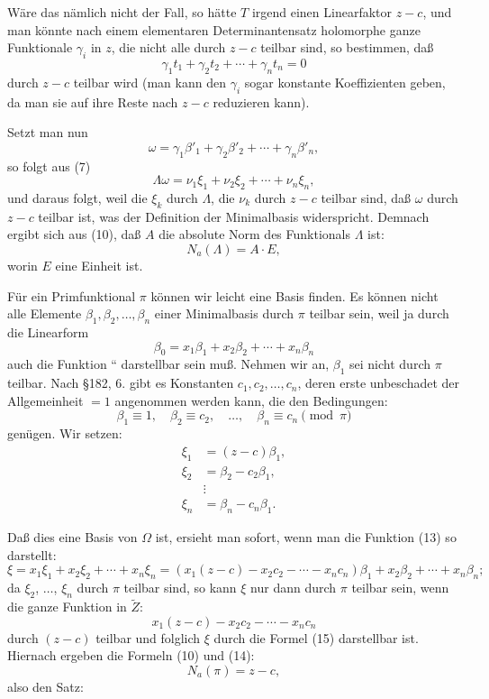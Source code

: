 \documentclass[12pt,a4paper]{article}
\theoremstyle{definition}
\begin{document}
Wäre das nämlich nicht der Fall, so hätte $T$ irgend einen Linearfaktor $z - c$, und man könnte nach einem elementaren Determinantensatz holomorphe ganze Funktionale $\gamma_i$ in $z$, die nicht alle durch $z - c$ teilbar sind, so bestimmen, daß
\[\gamma_1t_1 + \gamma_2t_2 + \cdots + \gamma_nt_n = 0\]
durch $z - c$ teilbar wird (man kann den $\gamma_i$ sogar konstante Koeffizienten geben, da man sie auf ihre Reste nach $z - c$ reduzieren kann).

Setzt man nun
\[\omega = \gamma_1\beta'_1 + \gamma_2\beta'_2 + \cdots + \gamma_n\beta'_n,\]
so folgt aus (7)
\[\Lambda\omega = \nu_1\xi_1 + \nu_2\xi_2 + \cdots + \nu_n\xi_n,\]
und daraus folgt, weil die $\xi_k$ durch $\Lambda$, die $\nu_k$ durch $z - c$ teilbar sind, daß $\omega$ durch $z - c$ teilbar ist, was der Definition der Minimalbasis widerspricht. Demnach ergibt sich aus (10), daß $A$ die absolute Norm des Funktionals $\Lambda$ ist:
\begin{equation}
N_a(\Lambda) = A \cdot E,
\end{equation}
worin $E$ eine Einheit ist.

Für ein Primfunktional $\pi$ können wir leicht eine Basis finden. Es können nicht alle Elemente $\beta_1, \beta_2, \ldots, \beta_n$ einer Minimalbasis durch $\pi$ teilbar sein, weil ja durch die Linearform
\begin{equation}
\beta_0 = x_1\beta_1 + x_2\beta_2 + \cdots + x_n\beta_n
\end{equation}
auch die Funktion `` darstellbar sein muß. Nehmen wir an, $\beta_1$ sei nicht durch $\pi$ teilbar. Nach \S 182, 6. gibt es Konstanten $c_1, c_2, \ldots, c_n$, deren erste unbeschadet der Allgemeinheit $= 1$ angenommen werden kann, die den Bedingungen:
\[\beta_1 \equiv 1, \quad \beta_2 \equiv c_2, \quad \ldots, \quad \beta_n \equiv c_n \pmod{\pi}\]
genügen. Wir setzen:
\begin{equation}
\begin{aligned}
\xi_1 &= (z - c)\beta_1, \\
\xi_2 &= \beta_2 - c_2\beta_1, \\
&\vdots \\
\xi_n &= \beta_n - c_n\beta_1.
\end{aligned}
\end{equation}

Daß dies eine Basis von $\Omega$ ist, ersieht man sofort, wenn man die Funktion (13) so darstellt:
\begin{equation}
\xi = x_1\xi_1 + x_2\xi_2 + \cdots + x_n\xi_n = (x_1(z-c) - x_2c_2 - \cdots - x_nc_n)\beta_1 + x_2\beta_2 + \cdots + x_n\beta_n;
\end{equation}
da $\xi_2$, $\ldots$, $\xi_n$ durch $\pi$ teilbar sind, so kann $\xi$ nur dann durch $\pi$ teilbar sein, wenn die ganze Funktion in $\tilde{Z}$:
\[x_1(z-c) - x_2c_2 - \cdots - x_nc_n\]
durch $(z - c)$ teilbar und folglich $\xi$ durch die Formel (15) darstellbar ist. Hiernach ergeben die Formeln (10) und (14):
\begin{equation}
N_a(\pi) = z - c,
\end{equation}
also den Satz:
\end{document}
